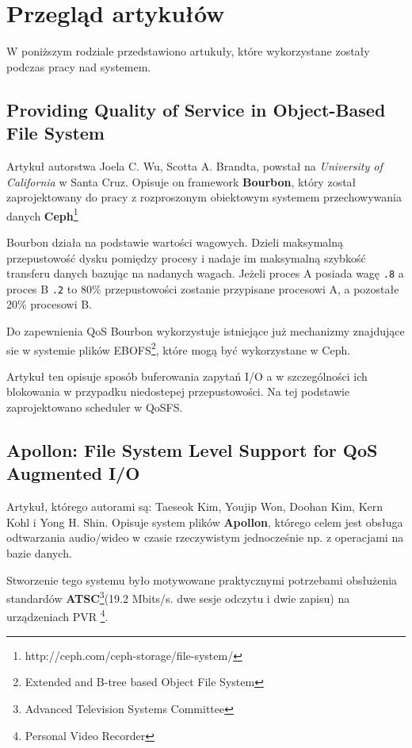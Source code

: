 \chapter{Przegląd artykułów} \label{ch:articles}
W poniższym rodziale przedstawiono artukuły, które wykorzystane zostały
podczas pracy nad systemem.

\section{Providing Quality of Service in Object-Based File System}

Artykuł autorstwa Joela C. Wu, Scotta A. Brandta, powstał na \textit{University of California} w Santa Cruz.
Opisuje on framework \textbf{Bourbon}, który został zaprojektowany do pracy
z rozproszonym obiektowym systemem przechowywania danych \textbf{Ceph}\footnote{http://ceph.com/ceph-storage/file-system/}

Bourbon działa na podstawie wartości wagowych. Dzieli maksymalną przepustowość dysku
pomiędzy procesy i nadaje im maksymalną szybkość transferu danych bazując na 
nadanych wagach. Jeżeli proces A posiada wagę \texttt{.8} a proces B \texttt{.2}
to 80\% przepustowości zostanie przypisane procesowi A, a pozostałe 20\% procesowi B.

Do zapewnienia QoS Bourbon wykorzystuje istniejące już mechanizmy znajdujące sie 
w systemie plików EBOFS\footnote{Extended and B-tree based Object File System}, które
mogą być wykorzystane w Ceph.

Artykuł ten opisuje sposób buferowania zapytań I/O a w szczególności ich blokowania
w przypadku niedostepej przepustowości. Na tej podstawie zaprojektowano scheduler w QoSFS.

\section{Apollon: File System Level Support for QoS Augmented I/O}

Artykuł, którego autorami są: Taeseok Kim, Youjip Won, Doohan Kim, Kern Kohl i Yong H. Shin.
Opisuje system plików \textbf{Apollon}, którego celem jest obsługa odtwarzania
audio/wideo w czasie rzeczywistym jednocześnie np. z operacjami na bazie danych.

Stworzenie tego systemu było motywowane praktycznymi potrzebami obsłużenia standardów
\textbf{ATSC}\footnote{Advanced Television Systems Committee}(19.2 Mbits/s. dwe sesje odczytu i 
dwie zapisu) na urządzeniach PVR
\footnote{Personal Video Recorder}.

